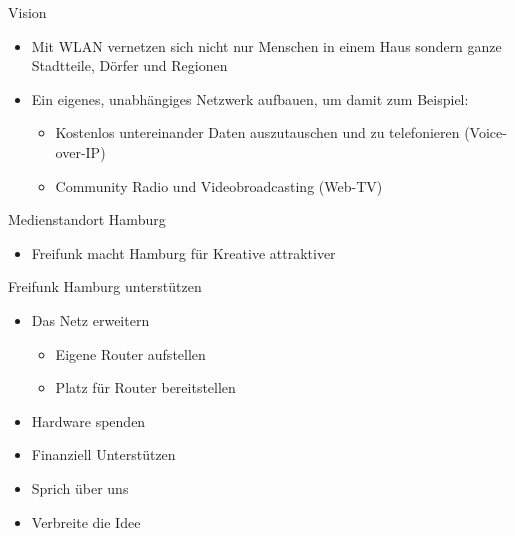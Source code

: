 \documentclass[c]{beamer}
\begin{document}
\begin{frame}{Vision}
	\begin{itemize}
		\item Mit WLAN vernetzen sich nicht nur Menschen in einem Haus sondern ganze Stadtteile, Dörfer und Regionen %
		\item Ein eigenes, unabhängiges Netzwerk aufbauen, um damit zum Beispiel:
		\begin{itemize}
			\item Kostenlos untereinander Daten auszutauschen und zu telefonieren (Voice-over-IP)
			\item Community Radio und Videobroadcasting (Web-TV)
		\end{itemize}
	\end{itemize}
\end{frame}

\begin{frame}{Medienstandort Hamburg}
	\begin{itemize}
		\item Freifunk macht Hamburg für Kreative attraktiver
	\end{itemize}
\end{frame}

\begin{frame}{Freifunk Hamburg unterstützen}
	\begin{itemize}
		\item Das Netz erweitern
		\begin{itemize}
			\item Eigene Router aufstellen
			\item Platz für Router bereitstellen
		\end{itemize}
		\item Hardware spenden
		\item Finanziell Unterstützen
		\item Sprich über uns
		\item Verbreite die Idee
	\end{itemize}
\end{frame}
\end{document}
